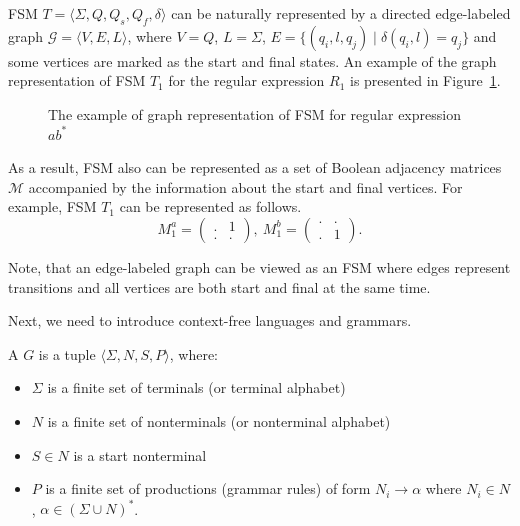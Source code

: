FSM $T = \langle \Sigma, Q, Q_s, Q_f, \delta \rangle$ can be naturally represented by a directed edge-labeled graph $\mathcal{G} = \langle V,E,L \rangle$, where $V = Q$, $L = \Sigma$, $E = \{(q_i,l,q_j) \mid \delta(q_i,l) = q_j\}$ and some vertices are marked as the start and final states.
An example of the graph representation of FSM $T_1$ for the regular expression $R_1$ is presented in Figure~\ref{fig:example_fsm}.

\begin{figure}[h]
    \centering
    \caption{The example of graph representation of FSM for regular expression $ab^*$}
    \label{fig:example_fsm}
\end{figure}

As a result, FSM also can be represented as a set of Boolean adjacency matrices $\mathcal{M}$ accompanied by the information about the start and final vertices.
For example, FSM $T_1$ can be represented as follows.
$$
M_1^a =
\begin{pmatrix}
.&1 \\
.&.
\end{pmatrix},~
M_1^b =
\begin{pmatrix}
.&. \\
.&1
\end{pmatrix}.
$$

Note, that an edge-labeled graph can be viewed as an FSM where edges represent transitions and all vertices are both start and final at the same time.

Next, we need to introduce context-free languages and grammars.

\begin{definition}
A  $G$ is a tuple $\langle\Sigma, N, S, P\rangle$, where:
\begin{itemize}
    \item $\Sigma$ is a finite set of terminals (or terminal alphabet)
    \item $N$ is a finite set of nonterminals (or nonterminal alphabet)
    \item $S \in N$ is a start nonterminal
    \item $P$ is a finite set of productions (grammar rules) of form $N_i \to \alpha$ where  $N_i \in N$, $\alpha \in (\Sigma \cup N)^*$.
\end{itemize}
\end{definition}

